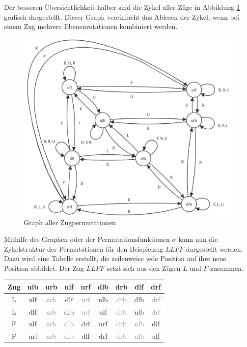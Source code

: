\documentclass[12pt,a4paper, usenames, dvipsnames]{article}
\theoremstyle{mystyle}
\theoremstyle{definition}
\begin{document}
 
Der besseren Übersichtlichkeit halber sind die Zykel aller Züge in Abbildung \ref{Abbildung_GraphAllerPermutationen} grafisch dargestellt.
Dieser Graph vereinfacht das Ablesen der Zykel, wenn bei einem Zug mehrere Ebenenrotationen kombiniert werden.
\begin{figure}[H]
\centering
\includegraphics[scale=0.25]{graph_zug1.png}
\caption[Graph aller Zugpermutationen]{Graph aller Zugpermutationen}
\label{Abbildung_GraphAllerPermutationen}
\end{figure}

Mithilfe des Graphen oder der Permutationsfunktionen $\sigma$ kann nun die Zykelstruktur der Permutationen für den Beispielzug $LLFF$ dargestellt werden. 
Dazu wird eine Tabelle erstellt, die zeilenweise jede Position auf ihre neue Position abbildet. Der Zug $LLFF$ setzt sich aus den Zügen $L$ und $F$ zusammen. 

\begin{center}
\begin{tabular}{ccccccccc}
\toprule
\textbf{Zug} & \textbf{ulb} & \textbf{urb} & \textbf{ulf} & \textbf{urf} & \textbf{dlb} & \textbf{drb} & \textbf{dlf} & \textbf{drf} \\
\midrule

L & ulf & \textcolor{gray}{urb} & dlf & \textcolor{gray}{urf} & ulb & \textcolor{gray}{drb} & dlb & \textcolor{gray}{drf} \\

L & dlf & \textcolor{gray}{urb} & dlb & \textcolor{gray}{urf} & ulf & \textcolor{gray}{drb} & ulb & \textcolor{gray}{drf} \\

F & ulf & \textcolor{gray}{urb} & \textcolor{gray}{dlb} & drf & urf & \textcolor{gray}{drb} & \textcolor{gray}{ulb} & dlf \\

F & urf & \textcolor{gray}{urb} & \textcolor{gray}{dlb} & dlf & drf & \textcolor{gray}{drb} & \textcolor{gray}{ulb} & ulf \\
\bottomrule
\end{tabular}
\end{center}
\end{document}
